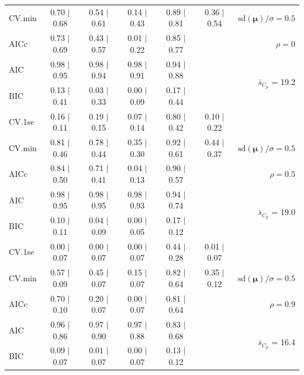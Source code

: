 \documentclass[12pt]{article}
\newcommand{\mr}[1]{\mathrm{#1}}
\newcommand{\bm}[1]{\mathbf{#1}}
\begin{document}
\begin{table}[p]
\begin{center}
\begin{tabular}{l*{5}{c}|r}
CV.min & 0.70 $\mid$ 0.68 & 0.54 $\mid$ 0.61 & 0.14 $\mid$ 0.43 & 0.89 $\mid$ 0.81 & 0.36 $\mid$ 0.54 &  $\mr{sd}(\bm{\mu})/\sigma=0.5$ \\
AICc & 0.73 $\mid$ 0.69 & 0.43 $\mid$ 0.57 & 0.01 $\mid$ 0.22 & 0.85 $\mid$ 0.77 & & $\rho=0$ \\
AIC & 0.98 $\mid$ 0.95 & 0.98 $\mid$ 0.94 & 0.98 $\mid$ 0.91 & 0.94 $\mid$ 0.88 & & \multirow{2}{*}{$\bar{s}_{C_p}$ = 19.2} \\
BIC & 0.13 $\mid$ 0.41 & 0.03 $\mid$ 0.33 & 0.00 $\mid$ 0.09 & 0.17 $\mid$ 0.44 & & \\
 \hline 
CV.1se & 0.16 $\mid$ 0.11 & 0.19 $\mid$ 0.15 & 0.07 $\mid$ 0.14 & 0.80 $\mid$ 0.42 & 0.10 $\mid$ 0.22 &\\
CV.min & 0.81 $\mid$ 0.46 & 0.78 $\mid$ 0.44 & 0.35 $\mid$ 0.30 & 0.92 $\mid$ 0.61 & 0.44 $\mid$ 0.37 &  $\mr{sd}(\bm{\mu})/\sigma=0.5$ \\
AICc & 0.84 $\mid$ 0.50 & 0.71 $\mid$ 0.41 & 0.04 $\mid$ 0.13 & 0.90 $\mid$ 0.57 & & $\rho=0.5$ \\
AIC & 0.98 $\mid$ 0.95 & 0.98 $\mid$ 0.95 & 0.98 $\mid$ 0.93 & 0.94 $\mid$ 0.74 & & \multirow{2}{*}{$\bar{s}_{C_p}$ = 19.0} \\
BIC & 0.10 $\mid$ 0.11 & 0.04 $\mid$ 0.09 & 0.00 $\mid$ 0.05 & 0.17 $\mid$ 0.12 & & \\
 \hline 
CV.1se & 0.00 $\mid$ 0.07 & 0.00 $\mid$ 0.07 & 0.00 $\mid$ 0.07 & 0.44 $\mid$ 0.28 & 0.01 $\mid$ 0.07 &\\
CV.min & 0.57 $\mid$ 0.09 & 0.45 $\mid$ 0.07 & 0.15 $\mid$ 0.07 & 0.82 $\mid$ 0.64 & 0.35 $\mid$ 0.12 &  $\mr{sd}(\bm{\mu})/\sigma=0.5$ \\
AICc & 0.70 $\mid$ 0.10 & 0.20 $\mid$ 0.07 & 0.00 $\mid$ 0.07 & 0.81 $\mid$ 0.64 & & $\rho=0.9$ \\
AIC & 0.96 $\mid$ 0.86 & 0.97 $\mid$ 0.90 & 0.97 $\mid$ 0.88 & 0.83 $\mid$ 0.68 & & \multirow{2}{*}{$\bar{s}_{C_p}$ = 16.4} \\
BIC & 0.09 $\mid$ 0.07 & 0.01 $\mid$ 0.07 & 0.00 $\mid$ 0.07 & 0.13 $\mid$ 0.12 & & \\
 \hline 
 \end{tabular}
\end{center}
\vspace{-1cm}
\end{table}
\end{document}
